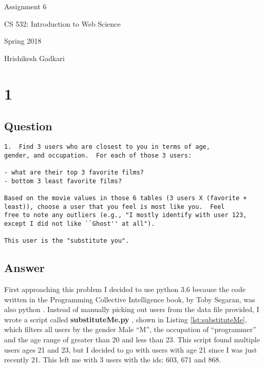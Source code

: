 \documentclass[letterpaper,11pt]{article}
\begin{document}
\begin{titlepage}

\begin{center}

\Huge{Assignment 6}

\Large{CS 532:  Introduction to Web Science}

\Large{Spring 2018}

\Large{Hrishikesh Gadkari}


\end{center}

\end{titlepage}

\newpage


\section*{1}

\subsection*{Question}

\begin{verbatim}
1.  Find 3 users who are closest to you in terms of age, 
gender, and occupation.  For each of those 3 users:

- what are their top 3 favorite films?
- bottom 3 least favorite films?

Based on the movie values in those 6 tables (3 users X (favorite +
least)), choose a user that you feel is most like you.  Feel 
free to note any outliers (e.g., "I mostly identify with user 123,
except I did not like ``Ghost'' at all").  

This user is the "substitute you".  
\end{verbatim}

\clearpage
\subsection*{Answer}

First approaching this problem I decided to use python 3.6 because the code written in the Programming Collective Intelligence book, by Toby Segaran, was also python \cite{collectiveIntell}. Instead of manually picking out users from the data file provided, I wrote a script called \textbf{substituteMe.py} , shown in Listing \ref{lst:substituteMe}, which filters all users by the gender Male ``M'', the occupation of ``programmer'' and the age range of greater than 20 and less than 23. This script found multiple users ages 21 and 23, but I decided to go with users with age 21 since I was just recently 21. This left me with 3 users with the ids: 603, 671 and 868. 
\end{document}
